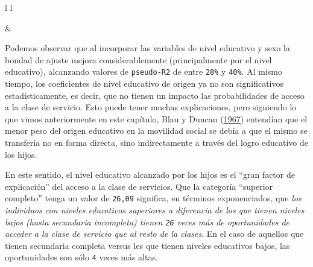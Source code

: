 \documentclass[
]{article}
\begin{document}
\begin{table}[ht]
\begin{centerbox}
\begin{threeparttable}
\begin{tabular}{l l}
\hhline{}

 &
 \tabularnewline[-0.5pt]



 \tabularnewline[-0.5pt]


\hhline{}
\end{tabular}
\end{threeparttable}\par\end{centerbox}

\end{table}
 

Podemos observar que al incorporar las variables de nivel educativo y sexo la bondad de ajuste mejora considerablemente (principalmente por el nivel educativo), alcanzando valores de \texttt{pseudo-R2} de entre \texttt{28\%} y \texttt{40\%}. Al mismo tiempo, los coeficientes de nivel educativo de origen ya no son significativos estadísticamente, es decir, que no tienen un impacto las probabilidades de acceso a la clase de servicio. Esto puede tener muchas explicaciones, pero siguiendo lo que vimos anteriormente en este capítulo, Blau y Duncan (\protect\hyperlink{ref-Blau.Duncan1967}{1967}) entendían que el menor peso del origen educativo en la movilidad social se debía a que el mismo se transfería no en forma directa, sino indirectamente a través del logro educativo de los hijos.

En este sentido, el nivel educativo alcanzado por los hijos es el ``gran factor de explicación'' del acceso a la clase de servicios. Que la categoría ``superior completo'' tenga un valor de \texttt{26,09} significa, en términos exponenciados, que \emph{los individuos con niveles educativos superiores a diferencia de los que tienen niveles bajos (hasta secundaria incompleta) tienen \texttt{26} veces más de oportunidades de acceder a la clase de servicio que al resto de la clases}. En el caso de aquellos que tienen secundaria completa versus les que tienen niveles educativos bajos, las oportunidades son sólo \texttt{4} veces más altas.
\end{document}
